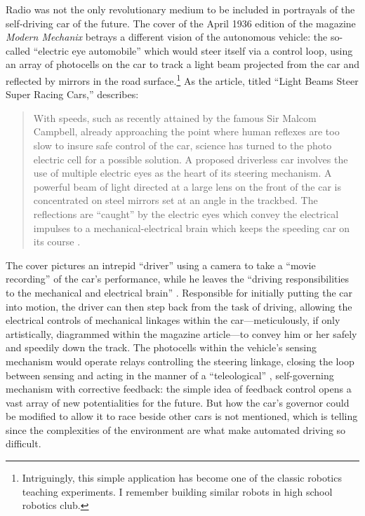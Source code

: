 Radio was not the only revolutionary medium to be included in
 portrayals of the self-driving car of the future. The cover of the
 April 1936 edition of the magazine \emph{Modern
   Mechanix} \cite{modernmechanix} betrays a 
 different vision of the autonomous vehicle: the so-called ``electric
 eye automobile'' which would steer itself via a control loop, using an
 array of photocells on the car to track a light
 beam projected from the car and reflected by mirrors in the road
 surface.\footnote{Intriguingly, this simple application has become
   one of the classic robotics teaching experiments. I remember
   building similar robots in high school robotics club.} As the article, titled ``Light Beams Steer Super Racing
 Cars,'' describes:
\begin{quote}
With speeds, such as recently attained by the famous Sir Malcom
Campbell, already approaching the point where human reflexes are too
slow to insure safe control of the car, science has turned to the
photo electric cell for a possible solution. A proposed driverless car
involves the use of multiple electric eyes as the heart of its
steering mechanism. A powerful beam of light directed at a large lens
on the front of the car is concentrated on steel mirrors set at an
angle in the trackbed. The reflections are ``caught'' by the electric
eyes which convey the electrical impulses to a mechanical-electrical
brain which keeps the speeding car on its course \cite[p. 71]{lightbeams}.
\end{quote}

The cover pictures an intrepid ``driver'' using a camera to take a
``movie recording'' of the car's performance, while he leaves the
``driving responsibilities to the mechanical and electrical brain''
\cite[p. 71]{lightbeams}.
Responsible for initially putting the car into motion, the driver can
then step back from the task of driving, allowing the electrical
controls of mechanical linkages within the car---meticulously, if only
artistically, diagrammed
within the magazine article---to convey him or her safely and speedily down
the track. The photocells within the vehicle's sensing mechanism would
operate relays controlling the steering linkage, closing the loop
between sensing and acting in the manner of a ``teleological''
\cite{behaviorPurpose}, 
self-governing mechanism with corrective feedback:  the simple
idea of feedback control opens a vast array of new potentialities for
the future. But how 
the car's governor could be modified to allow it to race
beside other cars is not mentioned, which is telling since the
complexities of the environment are what make automated driving so difficult.

